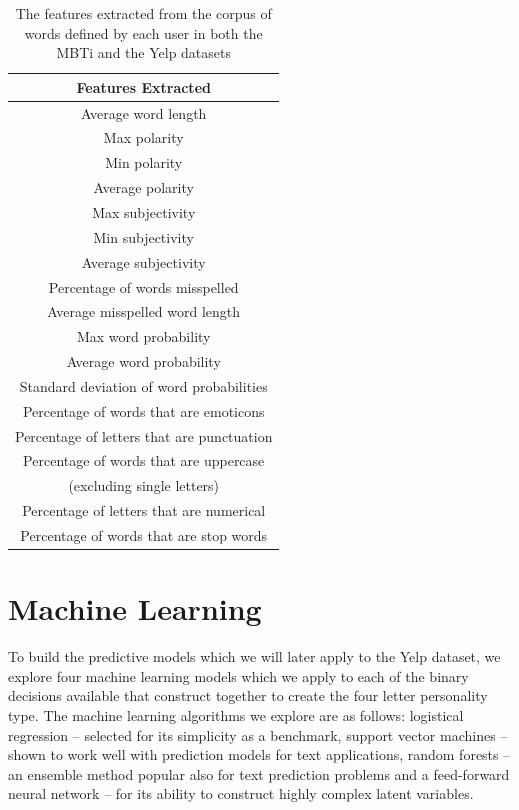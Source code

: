 \documentclass[sigconf, nonacm]{acmart}
\begin{document}
\begin{table}
\begin{tabular}{ | c | }
\hline
Features Extracted  \\
\hline 
Average word length  \\
Max polarity \\
Min polarity \\
Average polarity \\
Max subjectivity \\
Min subjectivity \\
Average subjectivity \\
Percentage of words misspelled \\
Average misspelled word length \\
Max word probability \\
Average word probability \\
Standard deviation of word probabilities \\
Percentage of words that are emoticons  \\
Percentage of letters that are punctuation \\
Percentage of words that are uppercase \\ (excluding single letters) \\
Percentage of letters that are numerical \\
Percentage of words that are stop words \\
\hline 
\end{tabular}

\caption{The features extracted from the corpus of words defined by each user in both the MBTi and the Yelp datasets}
\label{feature_engineering}
\end{table} 

\section{Machine Learning}

To build the predictive models which we will later apply to the Yelp dataset, we explore four machine learning models which we apply to each of the binary decisions available that construct together to create the four letter personality type. The machine learning algorithms we explore are as follows: logistical regression -- selected for its simplicity as a benchmark, support vector machines -- shown to work well with prediction models for text applications, random forests -- an ensemble method popular also for text prediction problems and a feed-forward neural network -- for its ability to construct highly complex latent variables. \\
\end{document}
